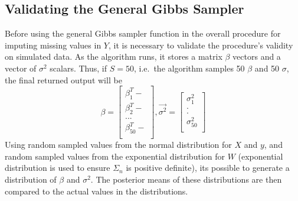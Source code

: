 \documentclass[12pt,twoside]{dukestatscithesis}
\theoremstyle{definition}
\theoremstyle{definition}
\theoremstyle{definition}
\theoremstyle{remark}
\begin{document}
\subsection{Validating the General Gibbs
Sampler}\label{validating-the-general-gibbs-sampler}

Before using the general Gibbs sampler function in the overall procedure
for imputing missing values in \(Y\), it is necessary to validate the
procedure's validity on simulated data. As the algorithm runs, it stores
a matrix \(\beta\) vectors and a vector of \(\sigma^2\) scalars. Thus,
if \(S = 50\), i.e.~the algorithm samples 50 \(\beta\) and 50
\(\sigma\), the final returned output will be \[\beta =
  \begin{bmatrix}
    \beta_1^T- \\
    \beta_2^T- \\
    ... \\
    \beta_{50}^T- \\
  \end{bmatrix},
  \vec{\sigma^2} =
  \begin{bmatrix}
    \sigma_1^2 \\
    . \\
    . \\
    \sigma_{50}^2\\
  \end{bmatrix}\]
Using random sampled values from the normal distribution for \(X\) and
\(y\), and random sampled values from the exponential distribution for
\(W\) (exponential distribution is used to ensure \(\Sigma_n\) is
positive definite), its possible to generate a distribution of \(\beta\)
and \(\sigma^2\). The posterior means of these distributions are then
compared to the actual values in the distributions.
\begin{Shaded}
\end{Shaded}
\end{document}
